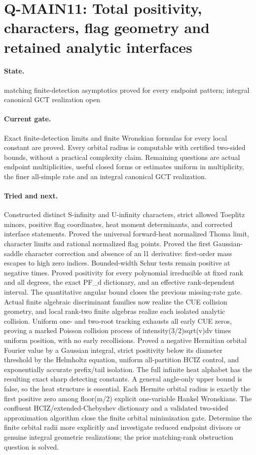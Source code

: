 \section{Q-MAIN11: Total positivity, characters, flag geometry and retained analytic interfaces}
\paragraph{State.} matching finite-detection asymptotics proved for every endpoint pattern; integral canonical GCT realization open
\paragraph{Current gate.} Exact finite-detection limits and finite Wronskian formulas for every local constant are proved. Every orbital radius is computable with certified two-sided bounds, without a practical complexity claim. Remaining questions are actual endpoint multiplicities, useful closed forms or estimates uniform in multiplicity, the finer all-simple rate and an integral canonical GCT realization.
\paragraph{Tried and next.} Constructed distinct S-infinity and U-infinity characters, strict allowed Toeplitz minors, positive flag coordinates, heat moment determinants, and corrected interface statements. Proved the universal forward-heat normalized Thoma limit, character limits and rational normalized flag points. Proved the first Gaussian-saddle character correction and absence of an l1 derivative: first-order mass escapes to high zero indices. Bounded-width Schur tests remain positive at negative times. Proved positivity for every polynomial irreducible at fixed rank and all degrees, the exact PF\_d dictionary, and an effective rank-dependent interval. The quantitative angular bound closes the previous missing-rate gate. Actual finite algebraic discriminant families now realize the CUE collision geometry, and local rank-two finite algebras realize each isolated analytic collision. Uniform one- and two-root tracking exhausts all early CUE zeros, proving a marked Poisson collision process of intensity(3/2)sqrt(v)dv times uniform position, with no early recollisions. Proved a negative Hermitian orbital Fourier value by a Gaussian integral, strict positivity below its diameter threshold by the Helmholtz equation, uniform all-partition HCIZ control, and exponentially accurate prefix/tail isolation. The full infinite heat alphabet has the resulting exact sharp detecting constants. A general angle-only upper bound is false, so the heat structure is essential. Each Hermite orbital radius is exactly the first positive zero among floor(m/2) explicit one-variable Hankel Wronskians. The confluent HCIZ/extended-Chebyshev dictionary and a validated two-sided approximation algorithm close the finite orbital minimization gate. Determine the finite orbital radii more explicitly and investigate reduced endpoint divisors or genuine integral geometric realizations; the prior matching-rank obstruction question is solved.

